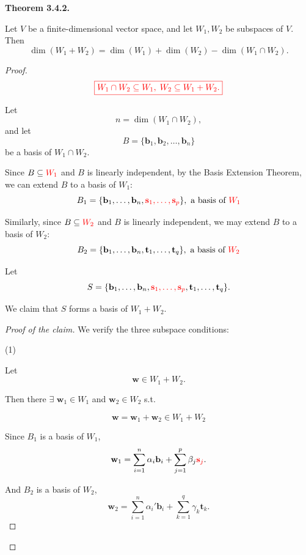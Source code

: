 \documentclass[12pt]{article}
\begin{document}
\textbf{Theorem 3.4.2.}

Let $V$ be a finite-dimensional vector space, and let $W_1,W_2$ be subspaces of $V$. Then
\[
\dim(W_1+W_2)=\dim(W_1)+\dim(W_2)-\dim(W_1\cap W_2).
\]

\begin{proof}


\[
\fcolorbox{red}{white}{\textcolor{red}{$W_1\cap W_2\subseteq W_1,\;W_2 \subseteq W_1+W_2.$}}
\]

Let
\[
n=\dim(W_1\cap W_2),
\]
and let
\[
B=\{\mathbf{b}_1,\mathbf{b}_2,\ldots,\mathbf{b}_n\}
\]
be a basis of $W_1\cap W_2$.

Since $B\subseteq \textcolor{red}{W_1}$ and $B$ is linearly independent,
by the Basis Extension Theorem, we can extend $B$ to a basis of $W_1$:
\[
B_1= \{\mathbf{b}_1,\ldots,\mathbf{b}_n, \textcolor{red}{\mathbf{s}_1,\ldots,\mathbf{s}_p}\}, \text{ a basis of } \textcolor{red}{W_1}
\]

Similarly, since $B\subseteq \textcolor{red}{W_2}$ and $B$ is linearly independent,
we may extend $B$ to a basis of $W_2$:
\[
B_2= \{\mathbf{b}_1,\ldots,\mathbf{b}_n, \mathbf{t}_1,\ldots,\mathbf{t}_q\}, \text{ a basis of } \textcolor{red}{W_2}
\]

\newpage


Let
\[
S= \{\mathbf{b}_1,\ldots,\mathbf{b}_n, \textcolor{red}{\mathbf{s}_1,\ldots,\mathbf{s}_p}, \mathbf{t}_1,\ldots,\mathbf{t}_q\}.
\]

We claim that $S$ forms a basis of $W_1+W_2$.

\medskip

\begin{proof}[Proof of the claim]
We verify the three subspace conditions:

(1) 

Let
\[
\mathbf{w}\in W_1+W_2.
\]

Then there $\exists$ $\mathbf{w}_1\in W_1$ and $\mathbf{w}_2\in W_2$ s.t.

\[
\mathbf{w}=\mathbf{w}_1+\mathbf{w}_2 \in W_1+W_2
\]

Since $B_1$ is a basis of $W_1$,
\[
\mathbf{w}_1= \sum_{i=1}^{n}\alpha_i\mathbf{b}_i + \sum_{j=1}^{p}\beta_j\textcolor{red}{\mathbf{s}_j}.
\]

And $B_2$ is a basis of $W_2$,
\[
\mathbf{w}_2= \sum_{i=1}^{n}\alpha_i'\mathbf{b}_i + \sum_{k=1}^{q}\gamma_k\mathbf{t}_k.
\]


\end{proof}
\end{proof}
\end{document}
